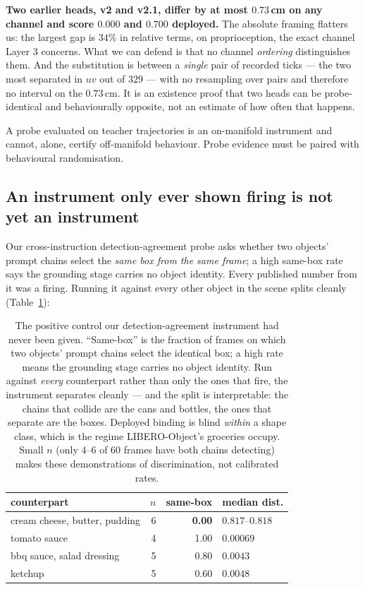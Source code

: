 \documentclass[10pt,twocolumn]{article}
\begin{document}
\textbf{Two earlier heads, v2 and v2.1, differ by at most $0.73$\,cm on any
channel and score $0.000$ and $0.700$ deployed.} The absolute framing flatters
us: the largest gap is $34\%$ in relative terms, on proprioception, the exact
channel Layer 3 concerns. What we can defend is that no channel \emph{ordering}
distinguishes them. And the substitution is between a
\emph{single} pair of recorded ticks --- the two most separated in $uv$ out of
$329$ --- with no resampling over pairs and therefore no interval on the
$0.73$\,cm. It is an existence proof that two heads can be probe-identical and
behaviourally opposite, not an estimate of how often that happens.

A probe evaluated on teacher trajectories is an on-manifold instrument and
cannot, alone, certify off-manifold behaviour. Probe evidence must be paired
with behavioural randomisation.

\subsection{An instrument only ever shown firing is not yet an instrument}

Our cross-instruction detection-agreement probe asks whether two objects' prompt
chains select the \emph{same box from the same frame}; a high same-box rate says
the grounding stage carries no object identity. Every published number from it
was a firing. Running it against every other object in the scene splits cleanly
(Table~\ref{tab:poscontrol}):

\begin{table}[h]\centering\footnotesize
\setlength{\tabcolsep}{4pt}
\begin{tabular}{lrrl}
\toprule
counterpart & $n$ & same-box & median dist. \\
\midrule
cream cheese, butter, pudding & 6 & \textbf{0.00} & $0.817$--$0.818$ \\
tomato sauce & 4 & 1.00 & $0.00069$ \\
bbq sauce, salad dressing & 5 & $0.80$ & $0.0043$ \\
ketchup & 5 & $0.60$ & $0.0048$ \\
\bottomrule
\end{tabular}
\caption{The positive control our detection-agreement instrument had never been
given. ``Same-box'' is the fraction of frames on which two objects' prompt
chains select the identical box; a high rate means the grounding stage carries
no object identity. Run against \emph{every} counterpart rather than only the
ones that fire, the instrument separates cleanly --- and the split is
interpretable: the chains that collide are the cans and bottles, the ones that
separate are the boxes. Deployed binding is blind \emph{within} a shape class,
which is the regime LIBERO-Object's groceries occupy. Small $n$ (only $4$--$6$
of $60$ frames have both chains detecting) makes these demonstrations of
discrimination, not calibrated rates.}
\label{tab:poscontrol}
\end{table}
\end{document}
